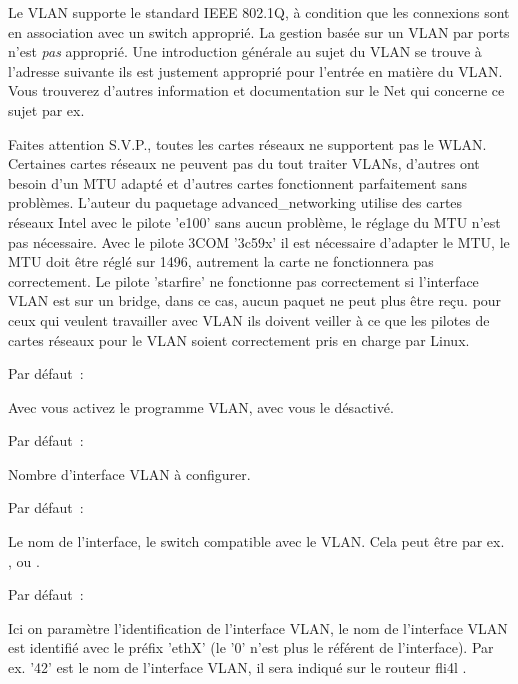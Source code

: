 Le VLAN supporte le standard IEEE 802.1Q, à condition que les connexions sont
en association avec un switch approprié. La gestion basée sur un VLAN par ports
n'est \emph{pas} approprié. Une introduction générale au sujet du VLAN se trouve
à l'adresse suivante
ils est justement approprié pour l'entrée en matière du VLAN. Vous trouverez
d'autres information et documentation sur le Net qui concerne ce sujet par ex.

Faites attention S.V.P., toutes les cartes réseaux ne supportent pas le WLAN.
Certaines cartes réseaux ne peuvent pas du tout traiter VLANs, d'autres ont
besoin d'un MTU adapté et d'autres cartes fonctionnent parfaitement sans problèmes.
L'auteur du paquetage advanced\_networking utilise des cartes réseaux Intel avec
le pilote 'e100' sans aucun problème, le réglage du MTU n'est pas nécessaire. Avec
le pilote 3COM '3c59x' il est nécessaire d'adapter le MTU, le MTU doit être réglé
sur 1496, autrement la carte ne fonctionnera pas correctement. Le pilote 'starfire'
ne fonctionne pas correctement si l'interface VLAN est sur un bridge, dans ce cas,
aucun paquet ne peut plus être reçu. pour ceux qui veulent travailler avec VLAN ils
doivent veiller à ce que les pilotes de cartes réseaux pour le VLAN soient
correctement pris en charge par Linux.

\begin{description}


  Par défaut~: 

  Avec  vous activez le programme VLAN, avec  vous le désactivé.


  Par défaut~: 

  Nombre d'interface VLAN à configurer.


  Par défaut~: 

  Le nom de l'interface, le switch compatible avec le VLAN. Cela peut être par ex.
  ,  ou .


  Par défaut~: 

  Ici on paramètre l'identification de l'interface VLAN, le nom de l'interface
  VLAN est identifié avec le préfix 'ethX' (le '0' n'est plus le référent de l'interface).
  Par ex. '42' est le nom de l'interface VLAN, il sera indiqué sur le routeur fli4l
  .

\end{description}


